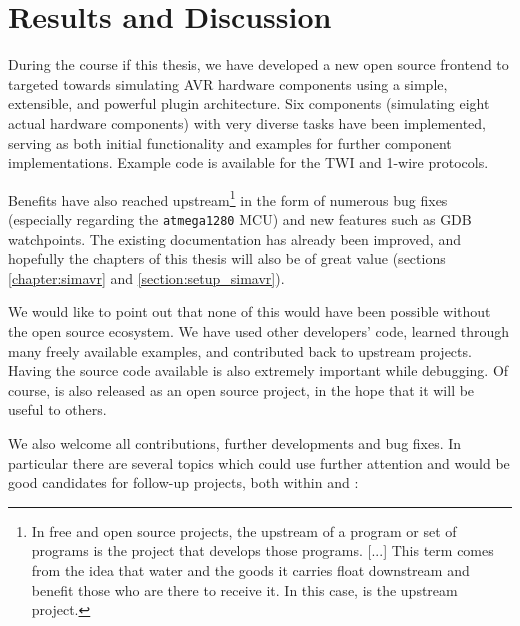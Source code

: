 
\chapter{Results and Discussion} \label{chapter:results}

During the course if this thesis, we have developed a new open source frontend
to \simavr targeted towards simulating \ac{AVR} hardware components using a
simple, extensible, and powerful plugin architecture. Six components (simulating
eight actual hardware components) with very diverse tasks have been implemented,
serving as both initial functionality and examples for further component
implementations. Example code is available for the \ac{TWI} and 1-wire protocols.

Benefits have also reached upstream\footnote{
%
In free and open source projects, the upstream of a program or set of
programs is the project that develops those programs. [...] This term comes
from the idea that water and the goods it
carries float downstream and benefit those who are there to receive it. \cite{fedora}
In this case, \simavr is the upstream project.
%
} in the form of numerous bug fixes (especially regarding the \verb|atmega1280|
\ac{MCU}) and new features such as \ac{GDB} watchpoints. The existing documentation
has already been improved, and hopefully the \simavr chapters of this thesis
will also be of great value (sections \ref{chapter:simavr} and \ref{section:setup_simavr}).

We would like to point out that none of this would have been possible without
the open source ecosystem. We have used other developers' code, learned through
many freely available examples, and contributed back to upstream projects.
Having the source code available is also extremely important while debugging.
Of course, \qsimavr is also released as an open source project, in the hope
that it will be useful to others.

We also welcome all contributions, further developments and bug fixes. In particular
there are several topics which could use further attention and would be good
candidates for follow-up projects, both within \qsimavr and \simavr:

